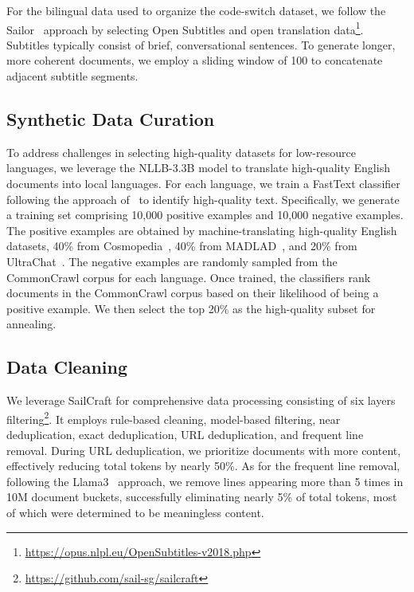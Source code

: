 For the bilingual data used to organize the code-switch dataset, we follow the Sailor~\citep{dou-etal-2024-sailor} approach by selecting Open Subtitles and open translation data\footnote{\url{https://opus.nlpl.eu/OpenSubtitles-v2018.php}}. 
Subtitles typically consist of brief, conversational sentences. To generate longer, more coherent documents, we employ a sliding window of 100 to concatenate adjacent subtitle segments.


\subsection{Synthetic Data Curation}\label{sec:synthetic_data_curation}

To address challenges in selecting high-quality datasets for low-resource languages, we leverage the NLLB-3.3B model to translate high-quality English documents into local languages. For each language, we train a FastText classifier following the approach of~\citet{li2024datacomplm} to identify high-quality text. Specifically, we generate a training set comprising 10,000 positive examples and 10,000 negative examples. The positive examples are obtained by machine-translating high-quality English datasets, 40\% from Cosmopedia~\citep{benallal2024cosmopedia}, 40\% from MADLAD~\citep{kudugunta2023madlad400}, and 20\% from UltraChat~\citep{ding2023enhancing}. The negative examples are randomly sampled from the CommonCrawl corpus for each language.
Once trained, the classifiers rank documents in the CommonCrawl corpus based on their likelihood of being a positive example. We then select the top 20\% as the high-quality subset for annealing.



\subsection{Data Cleaning}

We leverage SailCraft for comprehensive data processing consisting of six layers filtering\footnote{\url{https://github.com/sail-sg/sailcraft}}.
It employs rule-based cleaning, model-based filtering, near deduplication, exact deduplication, URL deduplication, and frequent line removal. 
During URL deduplication, we prioritize documents with more content, effectively reducing total tokens by nearly 50\%. 
As for the frequent line removal, following the Llama3~\citep{llama3} approach, we remove lines appearing more than 5 times in 10M document buckets, successfully eliminating nearly 5\% of total tokens, most of which were determined to be meaningless content.

